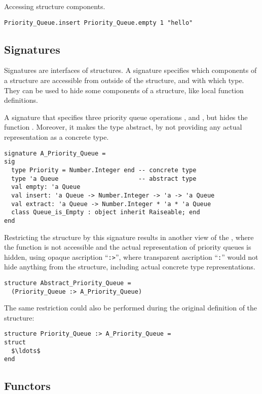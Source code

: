 \example Accessing structure components.
\begin{lstlisting}
Priority_Queue.insert Priority_Queue.empty 1 "hello"
\end{lstlisting}






\subsection{Signatures}

Signatures are interfaces of structures. A signature specifies which components of a structure are accessible from outside of the structure, and with which type. They can be used to hide some components of a structure, like local function definitions. 

\example A signature that specifies three priority queue operations ,  and , but hides the function . Moreover, it makes the  type abstract, by not providing any actual representation as a concrete type. 
\begin{lstlisting}
signature A_Priority_Queue =
sig
  type Priority = Number.Integer end -- concrete type
  type 'a Queue                      -- abstract type
  val empty: 'a Queue
  val insert: 'a Queue -> Number.Integer -> 'a -> 'a Queue
  val extract: 'a Queue -> Number.Integer * 'a * 'a Queue
  class Queue_is_Empty : object inherit Raiseable; end
end
\end{lstlisting}
Restricting the  structure by this signature results in another view of the , where the  function is not accessible and the actual representation of priority queues is hidden, using opaque ascription ``\lstinline!:>!'', where transparent ascription ``\lstinline!:!'' would not hide anything from the structure, including actual concrete type representations. 
\begin{lstlisting}
structure Abstract_Priority_Queue = 
  (Priority_Queue :> A_Priority_Queue)
\end{lstlisting}
The same restriction could also be performed during the original definition of the structure:
\begin{lstlisting}
structure Priority_Queue :> A_Priority_Queue =
struct 
  $\ldots$
end
\end{lstlisting}





\subsection{Functors}

